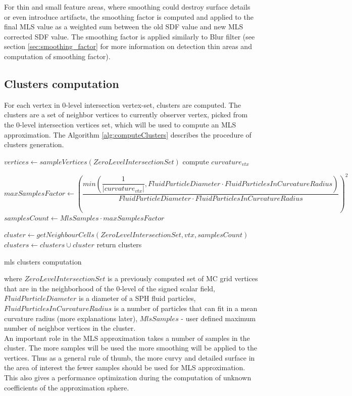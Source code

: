 For thin and small feature areas, where smoothing could destroy surface details or even introduce artifacts, the smoothing factor is computed and applied to the final MLS value as a weighted sum between the old SDF value and new MLS corrected SDF value. The smoothing factor is applied similarly to Blur filter (see section \ref{sec:smoothing_factor} for more information on detection thin areas and computation of smoothing factor).\\

\subsection{Clusters computation}
For each vertex in  0-level intersection vertex-set, clusters are computed. The clusters are a set of neighbor vertices to currently observer vertex, picked from the 0-level intersection vertices set, which will be used to compute an MLS approximation. The Algorithm \ref{alg:computeClusters} describes the procedure of clusters generation.
\begin{algorithm}[H]
	\scriptsize
	\begin{algorithmic}
			\State $vertices \gets sampleVertices(ZeroLevelIntersectionSet)$
				\State compute $curvature_{vtx}$

				\State $maxSamplesFactor \gets \left(\dfrac{min(\dfrac{1}{|curvature_{vtx}|}, FluidParticleDiameter \cdot FluidParticlesInCurvatureRadius)}{FluidParticleDiameter \cdot FluidParticlesInCurvatureRadius}\right)^2$
				\State $samplesCount \gets MlsSamples \cdot maxSamplesFactor$

				\State $cluster \gets getNeighbourCells(ZeroLevelIntersectionSet, vtx, samplesCount)$
				\State $clusters \gets clusters \cup cluster$ 
			\EndFor
			\State return clusters
	\end{algorithmic}
	\caption{mls clusters computation}
	\label{alg:computeClusters}
\end{algorithm}
where $ZeroLevelIntersectionSet$ is a previously computed set of MC grid vertices that are in the neighborhood of the 0-level of the signed scalar field, $FluidParticleDiameter$ is a diameter of a SPH fluid particles, $FluidParticlesInCurvatureRadius$ is a number of particles that can fit in a mean curvature radius (more explanations later), $MlsSamples$ - user defined maximum number of neighbor vertices in the cluster.\\
An important role in the MLS approximation takes a number of samples in the cluster. The more samples will be used the more smoothing will be applied to the vertices. Thus as a general rule of thumb, the more curvy and detailed surface in the area of interest the fewer samples should be used for MLS approximation. This also gives a performance optimization during the computation of unknown coefficients of the approximation sphere.\\
